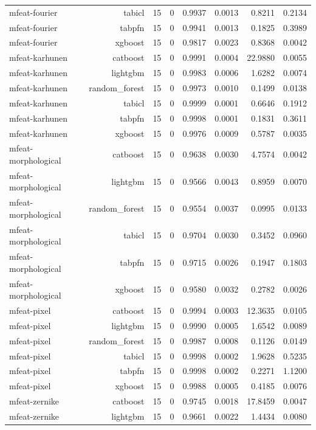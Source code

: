 \begin{table}[htbp]
\begin{tabular}{lrrrrrrr}
mfeat-fourier & tabicl & 15 & 0 & 0.9937 & 0.0013 & 0.8211 & 0.2134 \\
mfeat-fourier & tabpfn & 15 & 0 & 0.9941 & 0.0013 & 0.1825 & 0.3989 \\
mfeat-fourier & xgboost & 15 & 0 & 0.9817 & 0.0023 & 0.8368 & 0.0042 \\
mfeat-karhunen & catboost & 15 & 0 & 0.9991 & 0.0004 & 22.9880 & 0.0055 \\
mfeat-karhunen & lightgbm & 15 & 0 & 0.9983 & 0.0006 & 1.6282 & 0.0074 \\
mfeat-karhunen & random\_forest & 15 & 0 & 0.9973 & 0.0010 & 0.1499 & 0.0138 \\
mfeat-karhunen & tabicl & 15 & 0 & 0.9999 & 0.0001 & 0.6646 & 0.1912 \\
mfeat-karhunen & tabpfn & 15 & 0 & 0.9998 & 0.0001 & 0.1831 & 0.3611 \\
mfeat-karhunen & xgboost & 15 & 0 & 0.9976 & 0.0009 & 0.5787 & 0.0035 \\
mfeat-morphological & catboost & 15 & 0 & 0.9638 & 0.0030 & 4.7574 & 0.0042 \\
mfeat-morphological & lightgbm & 15 & 0 & 0.9566 & 0.0043 & 0.8959 & 0.0070 \\
mfeat-morphological & random\_forest & 15 & 0 & 0.9554 & 0.0037 & 0.0995 & 0.0133 \\
mfeat-morphological & tabicl & 15 & 0 & 0.9704 & 0.0030 & 0.3452 & 0.0960 \\
mfeat-morphological & tabpfn & 15 & 0 & 0.9715 & 0.0026 & 0.1947 & 0.1803 \\
mfeat-morphological & xgboost & 15 & 0 & 0.9580 & 0.0032 & 0.2782 & 0.0026 \\
mfeat-pixel & catboost & 15 & 0 & 0.9994 & 0.0003 & 12.3635 & 0.0105 \\
mfeat-pixel & lightgbm & 15 & 0 & 0.9990 & 0.0005 & 1.6542 & 0.0089 \\
mfeat-pixel & random\_forest & 15 & 0 & 0.9987 & 0.0008 & 0.1126 & 0.0149 \\
mfeat-pixel & tabicl & 15 & 0 & 0.9998 & 0.0002 & 1.9628 & 0.5235 \\
mfeat-pixel & tabpfn & 15 & 0 & 0.9998 & 0.0002 & 0.2271 & 1.1200 \\
mfeat-pixel & xgboost & 15 & 0 & 0.9988 & 0.0005 & 0.4185 & 0.0076 \\
mfeat-zernike & catboost & 15 & 0 & 0.9745 & 0.0018 & 17.8459 & 0.0047 \\
mfeat-zernike & lightgbm & 15 & 0 & 0.9661 & 0.0022 & 1.4434 & 0.0080 \\

\end{tabular}
\end{table}
